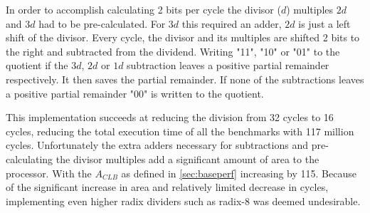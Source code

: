 \documentclass[final]{article}
\begin{document}
In order to accomplish calculating 2 bits per cycle the divisor ($d$) multiples $2d$ and $3d$ had to be pre-calculated. For $3d$ this required an adder, $2d$ is just a left shift of the divisor. Every cycle, the divisor and its multiples are shifted 2 bits to the right and subtracted from the dividend. Writing "11", "10" or "01" to the quotient if the $3d$, $2d$ or $1d$ subtraction leaves a positive partial remainder respectively. It then saves the partial remainder. If none of the subtractions leaves a positive partial remainder "00" is written to the quotient.

This implementation succeeds at reducing the division from 32 cycles to 16 cycles, reducing the total execution time of all the benchmarks with 117 million cycles. Unfortunately the extra adders necessary for subtractions and pre-calculating the divisor multiples add a significant amount of area to the processor. With the $A_{CLB}$ as defined in \cref{sec:baseperf} increasing by 115. Because of the significant increase in area and relatively limited decrease in cycles, implementing even higher radix dividers such as radix-8 was deemed undesirable.
\end{document}
